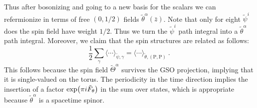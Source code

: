 \noindent Thus after bosonizing and going to a new basis for the scalars we can refermionize in terms of free $(0,1/2)$ fields $\tilde{\theta}^\alpha(\bar{z})$. Note that only for eight $\tilde{\psi}^i$ does the spin field have weight $1/2$. Thus we turn the $\tilde{\psi}^i$ path integral into a $\tilde{\theta}^\alpha$ path integral. Moreover, we claim that the spin structures are related as follows:
\begin{equation}
	\frac{1}{2}\sum_{\gamma}\langle\cdots\rangle_{\tilde{\psi},\gamma} = \langle\cdots\rangle_{\tilde{\theta},(\mathrm{P},\mathrm{P})} \:. \label{12.6.26}
\end{equation}
This follows because the spin field $\tilde{\Theta}^\alpha$ survives the GSO projection, implying that it is single-valued on the torus. The periodicity in the time direction implies the insertion of a factor $\exp(\pi i\tilde{F}_{\theta})$ in the sum over states, which is appropriate because $\tilde{\theta}^\alpha$ is a spacetime spinor.

